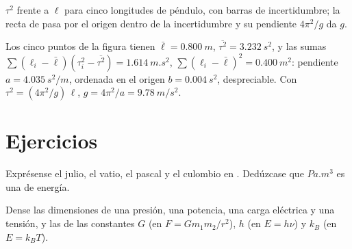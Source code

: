 \begin{omfigure}

{\small $\tau^2$ frente a $\ell$ para cinco longitudes de péndulo, con
barras de incertidumbre; la recta de  pasa por el origen
dentro de la incertidumbre y su pendiente $4\pi^2/g$ da $g$.}
\end{omfigure}

\begin{example}\label{ex:b1:units-dimensions:slope}
Los cinco puntos de la figura tienen $\bar\ell = \qty{0.800}{m}$,
$\overline{\tau^2} = \qty{3.232}{s^2}$, y las sumas
$\sum (\ell_i - \bar\ell)(\tau_i^2 - \overline{\tau^2}) = \qty{1.614}{m.s^2}$,
$\sum (\ell_i - \bar\ell)^2 = \qty{0.400}{m^2}$: pendiente
$a = \qty{4.035}{s^2/m}$, ordenada en el origen $b = \qty{0.004}{s^2}$, despreciable. Con
$\tau^2 = (4\pi^2/g)\,\ell$, $g = 4\pi^2/a = \qty{9.78}{m/s^2}$.
\end{example}

\section{Ejercicios}

\begin{exercise}[$\star$]\label{exo:b1:units-dimensions:1}
Exprésense el julio, el vatio, el pascal y el culombio en .
Dedúzcase que $\unit{Pa.m^3}$ es una  de energía.
\end{exercise}

\begin{exercise}[$\star$]\label{exo:b1:units-dimensions:2}
Dense las dimensiones de una presión, una potencia, una carga eléctrica y
una tensión, y las de las constantes $G$ (en $F = Gm_1m_2/r^2$), $h$ (en
$E = h\nu$) y $k_B$ (en $E = k_B T$).
\end{exercise}

